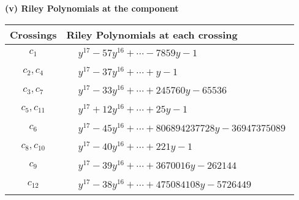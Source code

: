 \documentclass[1p]{elsarticle_modified}
\theoremstyle{definition}
\begin{document}
\newpage\renewcommand{\arraystretch}{1}
\flushleft \textbf{(v) Riley Polynomials at the component}\newline \\
\begin{tabular}{m{50pt}|m{274pt}}
Crossings & \hspace{64pt}Riley Polynomials at each crossing \\
\hline $$\begin{aligned}c_{1}\end{aligned}$$&$\begin{aligned}
&y^{17}-57 y^{16}+\cdots-7859 y-1
\end{aligned}$\\
\hline $$\begin{aligned}c_{2},c_{4}\end{aligned}$$&$\begin{aligned}
&y^{17}-37 y^{16}+\cdots+y-1
\end{aligned}$\\
\hline $$\begin{aligned}c_{3},c_{7}\end{aligned}$$&$\begin{aligned}
&y^{17}-33 y^{16}+\cdots+245760 y-65536
\end{aligned}$\\
\hline $$\begin{aligned}c_{5},c_{11}\end{aligned}$$&$\begin{aligned}
&y^{17}+12 y^{16}+\cdots+25 y-1
\end{aligned}$\\
\hline $$\begin{aligned}c_{6}\end{aligned}$$&$\begin{aligned}
&y^{17}-45 y^{16}+\cdots+806894237728 y-36947375089
\end{aligned}$\\
\hline $$\begin{aligned}c_{8},c_{10}\end{aligned}$$&$\begin{aligned}
&y^{17}-40 y^{16}+\cdots+221 y-1
\end{aligned}$\\
\hline $$\begin{aligned}c_{9}\end{aligned}$$&$\begin{aligned}
&y^{17}-39 y^{16}+\cdots+3670016 y-262144
\end{aligned}$\\
\hline $$\begin{aligned}c_{12}\end{aligned}$$&$\begin{aligned}
&y^{17}-38 y^{16}+\cdots+475084108 y-5726449
\end{aligned}$\\
\hline
\end{tabular}\\~\\
\end{document}
